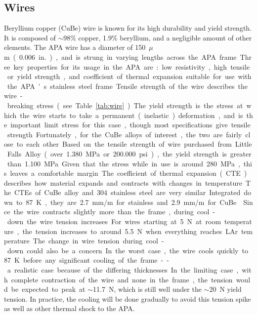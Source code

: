 \subsection{Wires}
\label{sec:fdsp-apa-wires}

Beryllium copper (CuBe) wire is known for its high durability and yield strength. It is composed of $\sim$98$\%$ copper, 1.9$\%$ beryllium, and a negligible amount of other elements. The APA wire has a diameter of \SI{150}{$\mu$m} (\SI{.006}{in.}), and is strung in varying lengths across the APA frame. Three key properties for its usage in the APA are: low resistivity, high tensile or yield strength, and coefficient of thermal expansion suitable for use with the APA's stainless steel frame.

Tensile strength of the wire describes the wire-breaking stress (see Table~\ref{tab:wire}).  The yield strength is the stress at which the wire starts to take a permanent (inelastic) deformation, and is the important limit stress for this case, though most specifications give tensile strength.  Fortunately, for the CuBe alloys of interest, the two are fairly close to each other.  Based on the tensile strength of wire purchased from Little Falls Alloy (over \SI{1,380}{MPa} or \SI{200,000}{psi}), the yield strength is greater than \SI{1,100}{MPa}.  Given that the stress while in use is around \SI{280}{MPa}, this leaves a comfortable margin.

The coefficient of thermal expansion (CTE) describes how material expands and contracts with changes in temperature.  The CTEs of CuBe alloy and 304 stainless steel are very similar.  Integrated down to \SI{87}{K}, they are \SI{2.7}{mm/m} for stainless and \SI{2.9}{mm/m} for CuBe~\cite{cryo-mat-db}. Since the wire contracts slightly more than the frame, during cool-down the wire tension increases.  For wires starting at \SI{5}{N} at room temperature, the tension increases to around \SI{5.5}{N} when everything reaches LAr temperature.  

The change in wire tension during cool-down could also be a concern.  In the worst case, the wire cools quickly to \SI{87}{K} before any significant cooling of the frame  -- a realistic case because of the differing thicknesses.  In the limiting case, with complete contraction of the wire and none in the frame, the tension would be expected to peak at $\sim$\SI{11.7}{N}, which is still well under the $\sim$\SI{20}{N} yield tension. In practice, the cooling will be done gradually to avoid this tension spike as well as other thermal shock to the APA.

